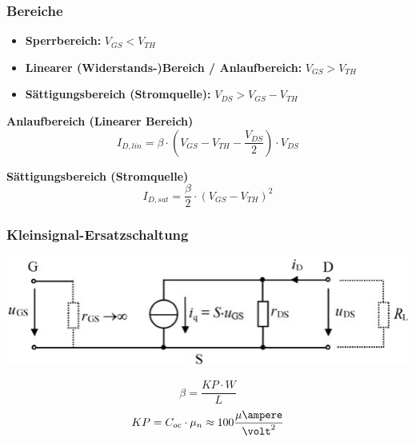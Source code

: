 \subsubsection{Bereiche}

\begin{itemize}
    \item \textbf{Sperrbereich:} $V_{GS} < V_{TH}$ 
    \item \textbf{Linearer (Widerstands-)Bereich / Anlaufbereich:} $V_{GS} > V_{TH}$
    \item \textbf{Sättigungsbereich (Stromquelle):} $V_{DS} > V_{GS} - V_{TH}$
\end{itemize}

\vspace{0.2cm}

\begin{minipage}[t]{0.48\columnwidth}
    \textbf{Anlaufbereich (Linearer Bereich)}
    $$ I_{D,lin} = \beta \cdot ( V_{GS} - V_{TH} - \frac{V_{DS}}{2} ) \cdot V_{DS} $$
\end{minipage}
\hfill
\begin{minipage}[t]{0.48\columnwidth}
    \textbf{Sättigungsbereich (Stromquelle)}
    $$ I_{D,sat} = \frac{\beta}{2} \cdot ( V_{GS} - V_{TH} )^2 $$
\end{minipage}



\subsubsection{Kleinsignal-Ersatzschaltung}

\begin{minipage}[t]{0.65\columnwidth}
    \includegraphics[align=t, width=\columnwidth]{images/mos_fet_kleinsignalersatzschaltung.png}
\end{minipage}
\hfill
\begin{minipage}[t]{0.33\columnwidth}
    $$ \beta = \frac{KP \cdot W}{L} $$
    $$ KP = C_{oc} \cdot \mu_n \approx 100 \frac{\mathrm{\mu} \ampere}{\volt^2} $$  %
\end{minipage}

